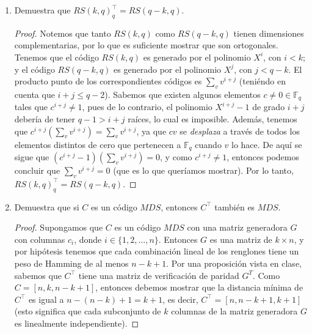 \documentclass[letterpaper,11pt]{article}
\begin{document}
\begin{enumerate}
    \item Demuestra que $RS(k, q)^{\top}_{q} = RS(q-k, q)$.
    \begin{proof}
        Notemos que tanto $RS(k,q)$ como $RS(q-k,q)$ tienen dimensiones 
        complementarias, por lo que es suficiente mostrar que son ortogonales.
        Tenemos que el código $RS(k,q)$ es generado por el polinomio $X^{i}$,
        con $i < k$; y el código $RS(q-k, q)$ es generado por el 
        polinomio $X^{j}$, con $j < q-k$. El producto punto de los 
        correspondientes códigos es $\sum_{v} v^{i+j}$ (teniéndo en cuenta que
        $i + j \leq q -2$). Sabemos que existen algunos elementos  
        $c \not = 0 \in \mathbb{F}_{q}$ tales que $c^{i+j} \not = 1$, pues de 
        lo contrario, el polinomio $X^{i+j}-1$ de grado $i+j$ debería de tener
        $q-1 > i+j$ raíces, lo cual es imposible.
        Además, tenemos que $c^{i+j} \left(\sum_{v} v^{i+j} \right) = 
        \sum_{v} v^{i+j}$, ya que $cv$ se \textit{desplaza} a través de todos
        los elementos distintos de cero que pertenecen a $\mathbb{F}_{q}$ 
        cuando $v$ lo hace. De aquí se sigue que $(c^{i+j}-1) \left(\sum_{v} 
        v^{i+j} \right) = 0$, y como $c^{i+j} \not = 1$, entonces podemos
        concluir que $\sum_{v} v^{i+j} = 0$ (que es lo que queríamos mostrar).
        Por lo tanto, $RS(k, q)^{\top}_{q} = RS(q-k, q)$.
         
    \end{proof}
        
    \item Demuestra que si $C$ es un código $MDS$, entonces $C^{\top}$ también
    es $MDS$. 
    \begin{proof}
        Supongamos que $C$ es un código $MDS$ con una matriz generadora $G$ 
        con columnas $c_{i}$, donde $i \in \{1,2, ..., n\}$. Entonces $G$ es
        una matriz de $k \times n$, y por hipótesis tenemos que cada 
        combinación lineal de los renglones tiene un peso de Hamming de al
        menos $n-k+1$. Por una proposición vista en clase, sabemos que 
        $C^{\top}$ tiene una matriz de verificación de paridad $G^{T}$.
        Como $C = [n,k,n-k+1]$, entonces debemos mostrar que la distancia
        mínima de $C^{\top}$ es igual a $n-(n-k)+1= k+1$, es decir, 
        $C^{\top} = [n,n-k+1,k+1]$ (esto significa que cada subconjunto de $k$ 
        columnas de la matriz generadora $G$ es linealmente independiente).
        

\end{proof}
\end{enumerate}
\end{document}

